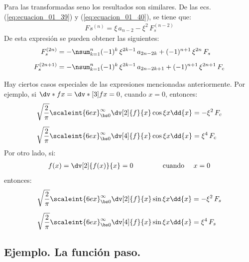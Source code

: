 Para las transformadas seno los resultados son similares. De las ecs. (\ref{eq:ecuacion_01_39}) y (\ref{eq:ecuacion_01_40}), se tiene que:
\begin{align*}
F_{}s^{(n)} = \xi \, a_{n-2} - \xi^{2} \, F_{s}^{(n-2)}
\end{align*}
De esta expresión se pueden obtener las siguientes:
\begin{align}
F_{s}^{(2n)} &= - \nsum_{k=1}^{n} (-1)^{k} \, \xi^{2k-1} \, a_{2n-2k} + (-1)^{n+1} \, \xi^{2n} \, F_{s} \label{eq:ecuacion_01_43} \\[0.5em]
F_{s}^{(2n+1)} &= - \nsum_{k=1}^{n} (-1)^{k} \, \xi^{2k-1} \, a_{2n-2k+1} + (-1)^{n+1} \, \xi^{2n+1} \, F_{c} \label{eq:ecuacion_01_44}
\end{align}

Hay ciertos casos especiales de las expresiones mencionadas anteriormente. Por ejemplo, si $\dv*{f}{x} = \dv*[3]{f}{x} = 0$, cuando $x = 0$, entonces:
\begin{align*}
\sqrt{\dfrac{2}{\pi}} \scaleint{6ex}_{\bs 0}^{\infty} \dv[2]{f}{x} \cos \xi x \dd{x} &= - \xi^{2} \, F_{c} \\[0.5em]
\sqrt{\dfrac{2}{\pi}} \scaleint{6ex}_{\bs 0}^{\infty} \dv[4]{f}{x} \cos \xi x \dd{x} &= \xi^{4} \, F_{c}
\end{align*}
Por otro lado, si:
\begin{align*}
f(x) = \dv[2]{f(x)}{x} = 0 \hspace{1.5cm} \mbox{cuando \quad} x = 0
\end{align*}
entonces:
\begin{align*}
\sqrt{\dfrac{2}{\pi}} \scaleint{6ex}_{\bs 0}^{\infty} \dv[2]{f}{x} \sin \xi x \dd{x} &= - \xi^{2} \, F_{s} \\[0.5em]
\sqrt{\dfrac{2}{\pi}} \scaleint{6ex}_{\bs 0}^{\infty} \dv[4]{f}{x} \sin \xi x \dd{x} &= \xi^{4} \, F_{s}
\end{align*}



\subsection*{Ejemplo. La función paso.}

